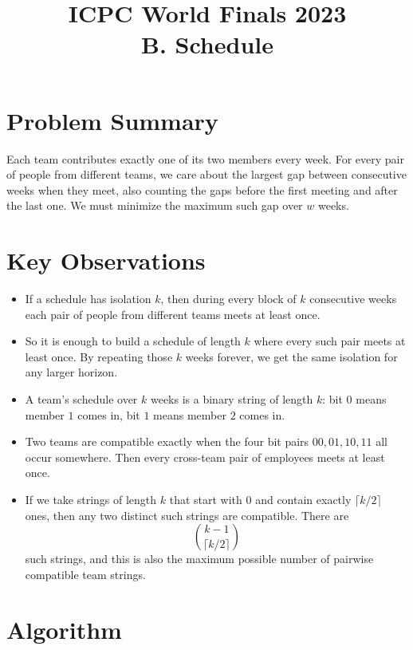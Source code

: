 \documentclass[11pt]{article}
\title{ICPC World Finals 2023\\B. Schedule}
\author{}
\date{}
\begin{document}
\maketitle

\section*{Problem Summary}

Each team contributes exactly one of its two members every week. For every pair of people from different
teams, we care about the largest gap between consecutive weeks when they meet, also counting the gaps
before the first meeting and after the last one. We must minimize the maximum such gap over $w$ weeks.

\section*{Key Observations}

\begin{itemize}[leftmargin=*]
    \item If a schedule has isolation $k$, then during every block of $k$ consecutive weeks each pair of
    people from different teams meets at least once.
    \item So it is enough to build a schedule of length $k$ where every such pair meets at least once. By
    repeating those $k$ weeks forever, we get the same isolation for any larger horizon.
    \item A team's schedule over $k$ weeks is a binary string of length $k$: bit $0$ means member $1$
    comes in, bit $1$ means member $2$ comes in.
    \item Two teams are compatible exactly when the four bit pairs $00,01,10,11$ all occur somewhere.
    Then every cross-team pair of employees meets at least once.
    \item If we take strings of length $k$ that start with $0$ and contain exactly $\lceil k/2\rceil$ ones,
    then any two distinct such strings are compatible. There are
    \[
    \binom{k-1}{\lceil k/2\rceil}
    \]
    such strings, and this is also the maximum possible number of pairwise compatible team strings.
\end{itemize}

\section*{Algorithm}
\end{document}
